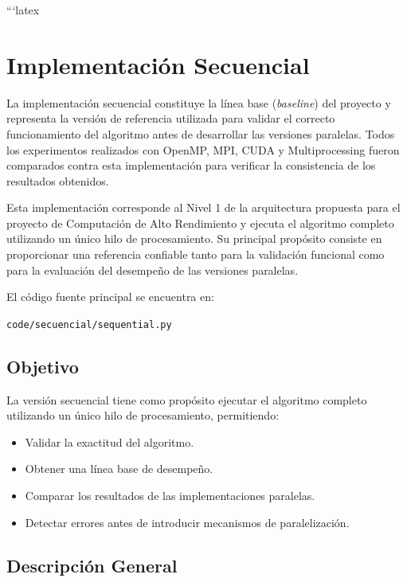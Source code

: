 ```latex
\chapter{Implementación Secuencial}

La implementación secuencial constituye la línea base (\textit{baseline}) del proyecto y representa la versión de referencia utilizada para validar el correcto funcionamiento del algoritmo antes de desarrollar las versiones paralelas. Todos los experimentos realizados con OpenMP, MPI, CUDA y Multiprocessing fueron comparados contra esta implementación para verificar la consistencia de los resultados obtenidos.

Esta implementación corresponde al Nivel 1 de la arquitectura propuesta para el proyecto de Computación de Alto Rendimiento y ejecuta el algoritmo completo utilizando un único hilo de procesamiento. Su principal propósito consiste en proporcionar una referencia confiable tanto para la validación funcional como para la evaluación del desempeño de las versiones paralelas.

El código fuente principal se encuentra en:

\begin{center}
\texttt{code/secuencial/sequential.py}
\end{center}

\section{Objetivo}

La versión secuencial tiene como propósito ejecutar el algoritmo completo utilizando un único hilo de procesamiento, permitiendo:

\begin{itemize}

\item Validar la exactitud del algoritmo.

\item Obtener una línea base de desempeño.

\item Comparar los resultados de las implementaciones paralelas.

\item Detectar errores antes de introducir mecanismos de paralelización.

\end{itemize}

\section{Descripción General}


